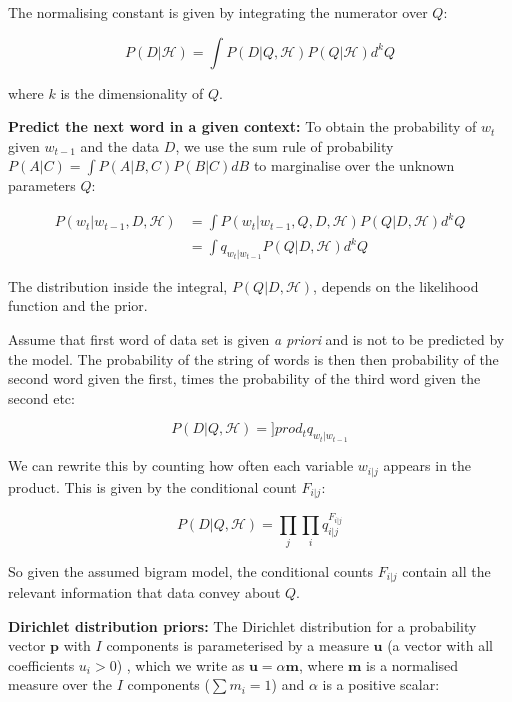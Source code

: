 \noindent The normalising constant is given by integrating the numerator over $Q$:

\begin{equation}
P(D|\mathscr{H})=\int P(D|Q, \mathscr{H})P(Q|\mathscr{H})d^{k}Q
\end{equation}

\noindent where $k$ is the dimensionality of $Q$.

\textbf{Predict the next word in a given context: } To obtain the probability of $w_{t}$ given $w_{t-1}$ and the data $D$, we use the sum rule of probability $P(A|C)=\int P(A|B, C)P(B|C)dB$ to marginalise over the unknown parameters $Q$:

\begin{align}
P(w_{t}|w_{t-1}, D, \mathscr{H}) &= \int P(w_{t}|w_{t-1}, Q, D, \mathscr{H})P(Q|D, \mathscr{H})d^{k}Q
\\
&= \int q_{w_{t}|w_{t-1}}P(Q|D, \mathscr{H})d^{k}Q
\end{align}

\noindent The distribution inside the integral, $P(Q|D, \mathscr{H})$, depends on the likelihood function and the prior.

Assume that first word of data set is given \textit{a priori} and is not to be predicted by the model. The probability of the string of words is then then probability of the second word given the first, times the probability of the third word given the second etc:

\begin{equation}
P(D|Q, \mathscr{H})=]prod_{t}q_{w_{t}|w_{t-1}}
\end{equation}

\noindent We can rewrite this by counting how often each variable $w_{i|j}$ appears in the product. This is given by the conditional count $F_{i|j}$:

\begin{equation}
P(D|Q, \mathscr{H})=\prod_{j}\prod_{i}q_{i|j}^{F_{i|j}}
\end{equation}

\noindent So given the assumed bigram model, the conditional counts $F_{i|j}$ contain all the relevant information that data convey about $Q$.

\textbf{Dirichlet distribution priors: }The Dirichlet distribution for a probability vector $\boldsymbol{p}$ with $I$ components is parameterised by a measure $\boldsymbol{u}$ (a vector with all coefficients $u_{i}>0$) , which we write as $\boldsymbol{u}=\alpha\boldsymbol{m}$, where $\boldsymbol{m}$ is a normalised measure over the $I$ components ($\sum m_{i}=1$) and $\alpha$ is a positive scalar:

